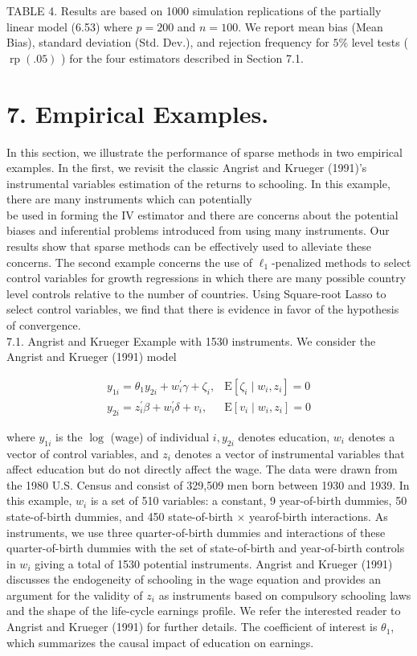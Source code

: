 \documentclass[10pt]{article}
\begin{document}
TABLE 4. Results are based on 1000 simulation replications of the partially linear model (6.53) where \(p=200\) and \(n=100\). We report mean bias (Mean Bias), standard deviation (Std. Dev.), and rejection frequency for \(5 \%\) level tests ( \(\operatorname{rp}(.05)\) ) for the four estimators described in Section 7.1.

\section*{7. Empirical Examples.}
In this section, we illustrate the performance of sparse methods in two empirical examples. In the first, we revisit the classic Angrist and Krueger (1991)'s instrumental variables estimation of the returns to schooling. In this example, there are many instruments which can potentially\\
be used in forming the IV estimator and there are concerns about the potential biases and inferential problems introduced from using many instruments. Our results show that sparse methods can be effectively used to alleviate these concerns. The second example concerns the use of \(\ell_{1}\)-penalized methods to select control variables for growth regressions in which there are many possible country level controls relative to the number of countries. Using Square-root Lasso to select control variables, we find that there is evidence in favor of the hypothesis of convergence.\\
7.1. Angrist and Krueger Example with 1530 instruments. We consider the Angrist and Krueger (1991) model

\[
\begin{array}{ll}
y_{1 i}=\theta_{1} y_{2 i}+w_{i}^{\prime} \gamma+\zeta_{i}, & \mathrm{E}\left[\zeta_{i} \mid w_{i}, z_{i}\right]=0 \\
y_{2 i}=z_{i}^{\prime} \beta+w_{i}^{\prime} \delta+v_{i}, & \mathrm{E}\left[v_{i} \mid w_{i}, z_{i}\right]=0
\end{array}
\]

where \(y_{1 i}\) is the \(\log\) (wage) of individual \(i, y_{2 i}\) denotes education, \(w_{i}\) denotes a vector of control variables, and \(z_{i}\) denotes a vector of instrumental variables that affect education but do not directly affect the wage. The data were drawn from the 1980 U.S. Census and consist of 329,509 men born between 1930 and 1939. In this example, \(w_{i}\) is a set of 510 variables: a constant, 9 year-of-birth dummies, 50 state-of-birth dummies, and 450 state-of-birth \(\times\) yearof-birth interactions. As instruments, we use three quarter-of-birth dummies and interactions of these quarter-of-birth dummies with the set of state-of-birth and year-of-birth controls in \(w_{i}\) giving a total of 1530 potential instruments. Angrist and Krueger (1991) discusses the endogeneity of schooling in the wage equation and provides an argument for the validity of \(z_{i}\) as instruments based on compulsory schooling laws and the shape of the life-cycle earnings profile. We refer the interested reader to Angrist and Krueger (1991) for further details. The coefficient of interest is \(\theta_{1}\), which summarizes the causal impact of education on earnings.
\end{document}
